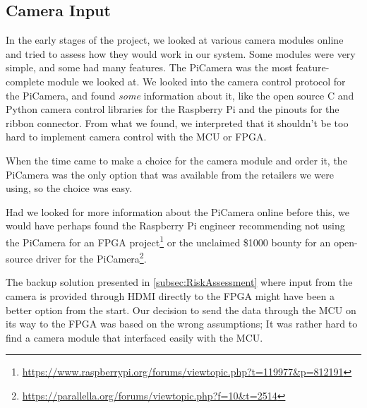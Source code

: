 \subsection{Camera Input}
\label{sec:camera_discussion}
In the early stages of the project,
we looked at various camera modules online and tried to assess how they would work in our system.
Some modules were very simple, and some had many features.
The PiCamera was the most feature-complete module we looked at.
We looked into the camera control protocol for the PiCamera,
and found \textit{some} information about it,
like the open source C and Python camera control libraries for the Raspberry Pi
and the pinouts for the ribbon connector.
From what we found, we interpreted that it shouldn't be too hard to implement camera control with the MCU or FPGA.

When the time came to make a choice for the camera module and order it,
the PiCamera was the only option that was available from the retailers we were using,
so the choice was easy.

Had we looked for more information about the PiCamera online before this,
we would have perhaps found the Raspberry Pi engineer recommending not using the PiCamera for an FPGA project\footnote{\url{https://www.raspberrypi.org/forums/viewtopic.php?t=119977&p=812191}} or the unclaimed \$1000 bounty for an open-source driver for the PiCamera\footnote{\url{https://parallella.org/forums/viewtopic.php?f=10&t=2514}}.

The backup solution presented in \ref{subsec:RiskAssessment} where input from the camera is provided through HDMI directly to the FPGA might have been a better option from the start.
Our decision to send the data through the MCU on its way to the FPGA was based on the wrong assumptions;
It was rather hard to find a camera module that interfaced easily with the MCU.


